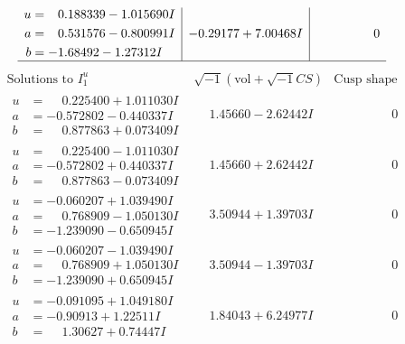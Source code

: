 \documentclass[1p]{elsarticle_modified}
\theoremstyle{definition}
\newcommand{\I}{\sqrt{-1}}
\begin{document}
$$\begin{array}{c|c|c}
\begin{aligned}
u &= \phantom{-}0.188339 - 1.015690 I \\
a &= \phantom{-}0.531576 - 0.800991 I \\
b &= -1.68492 - 1.27312 I\end{aligned}
 & -0.29177 + 7.00468 I & \phantom{-0.000000 } 0\\
 \hline 
 \end{array}$$\newpage$$\begin{array}{c|c|c}  
\text{Solutions to }I^u_{1}& \I (\text{vol} + \sqrt{-1}CS) & \text{Cusp shape}\\
 \hline 
\begin{aligned}
u &= \phantom{-}0.225400 + 1.011030 I \\
a &= -0.572802 - 0.440337 I \\
b &= \phantom{-}0.877863 + 0.073409 I\end{aligned}
 & \phantom{-}1.45660 - 2.62442 I & \phantom{-0.000000 } 0 \\ \hline\begin{aligned}
u &= \phantom{-}0.225400 - 1.011030 I \\
a &= -0.572802 + 0.440337 I \\
b &= \phantom{-}0.877863 - 0.073409 I\end{aligned}
 & \phantom{-}1.45660 + 2.62442 I & \phantom{-0.000000 } 0 \\ \hline\begin{aligned}
u &= -0.060207 + 1.039490 I \\
a &= \phantom{-}0.768909 - 1.050130 I \\
b &= -1.239090 - 0.650945 I\end{aligned}
 & \phantom{-}3.50944 + 1.39703 I & \phantom{-0.000000 } 0 \\ \hline\begin{aligned}
u &= -0.060207 - 1.039490 I \\
a &= \phantom{-}0.768909 + 1.050130 I \\
b &= -1.239090 + 0.650945 I\end{aligned}
 & \phantom{-}3.50944 - 1.39703 I & \phantom{-0.000000 } 0 \\ \hline\begin{aligned}
u &= -0.091095 + 1.049180 I \\
a &= -0.90913 + 1.22511 I \\
b &= \phantom{-}1.30627 + 0.74447 I\end{aligned}
 & \phantom{-}1.84043 + 6.24977 I & \phantom{-0.000000 } 0 \\ \hline\begin{aligned}

\end{aligned}
\end{array}$$
\end{document}
